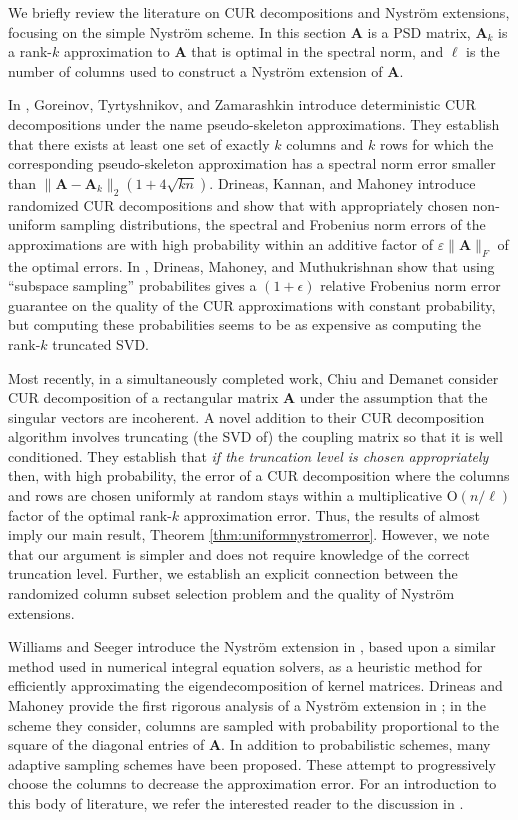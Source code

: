 \documentclass[11pt,letterpaper,twoside,reqno,nosumlimits]{amsart}
\newcommand{\mat}[1]{\ensuremath{\bm{#1}}}
\theoremstyle{remark}
\begin{document}
We briefly review the literature on CUR decompositions and Nystr\"om extensions, focusing on the simple Nystr\"om scheme. In this section $\mat{A}$ is a PSD matrix, $\mat{A}_k$ is a rank-$k$ approximation to $\mat{A}$ that is optimal in the spectral norm, and $\ell$ is the number of columns used to construct a Nystr\"om extension of $\mat{A}.$

In \cite{GTZ97}, Goreinov, Tyrtyshnikov, and Zamarashkin introduce deterministic CUR decompositions under the name pseudo-skeleton approximations. They establish that there exists at least one set of exactly $k$ columns and $k$ rows for which the corresponding pseudo-skeleton approximation has a spectral norm error smaller than $\|\mat{A} - \mat{A}_k\|_2 (1 +4 \sqrt{k n}).$  Drineas, Kannan, and Mahoney \cite{DKM06} introduce randomized CUR decompositions and show that with appropriately chosen non-uniform sampling distributions, the spectral and Frobenius norm errors of the approximations are with high probability within an additive factor of $\varepsilon \|\mat{A}\|_F$ of the optimal errors. In \cite{DMM08CUR}, Drineas, Mahoney, and Muthukrishnan show that using ``subspace sampling'' probabilites gives a $(1+\epsilon)$ relative Frobenius norm error guarantee on the quality of the CUR approximations with constant probability, but computing these probabilities seems to be as expensive as computing the rank-$k$ truncated SVD.

Most recently, in a simultaneously completed work, Chiu and Demanet \cite{CD11} consider CUR decomposition of a rectangular matrix $\mat{A}$ under the assumption that the singular vectors are incoherent. A novel addition to their CUR decomposition algorithm involves truncating (the SVD of) the coupling matrix so that it is well conditioned. They establish that \emph{if the truncation level is chosen appropriately} then, with high probability, the error of a CUR decomposition where the columns and rows are chosen uniformly at random stays within a multiplicative $\mathrm{O}(n/\ell)$ factor of the optimal rank-$k$ approximation error. Thus, the results of \cite{CD11} almost imply our main result, Theorem \ref{thm:uniformnystromerror}. However, we note that our argument is simpler and does not require knowledge of the correct truncation level. Further, we establish an explicit connection between the randomized column subset selection problem and the quality of Nystr\"om extensions.

Williams and Seeger introduce the Nystr\"om extension in \cite{SW01}, based upon a similar method used in numerical integral equation solvers, as a heuristic method for efficiently approximating the eigendecomposition of kernel matrices. %
Drineas and Mahoney provide the first rigorous analysis of a Nystr\"om extension in \cite{DM05}; in the scheme they consider, columns are sampled with probability proportional to the square of the diagonal entries of $\mat{A}$. In addition to probabilistic schemes, many adaptive sampling schemes have been proposed. These attempt to progressively choose the columns to decrease the approximation error. For an introduction to this body of literature, we refer the interested reader to the discussion in \cite{FGK11}.
\end{document}
